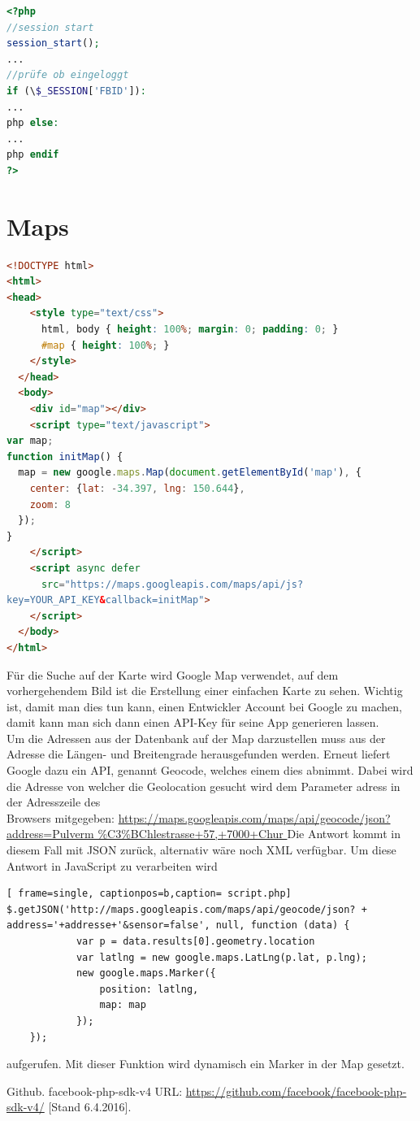 \documentclass[11pt,a4paper]{scrreprt}
\begin{document}
\begin{lstlisting}[language=PHP, frame=single, captionpos=b,caption= search\_list.php]
<?php
//session start
session_start(); 
...
//prüfe ob eingeloggt
if (\$_SESSION['FBID']):
...
php else: 
...
php endif 
?> 
\end{lstlisting}

\section{Maps}
\begin{lstlisting}[language=HTML, frame=single, captionpos=b]
<!DOCTYPE html>
<html>
<head>
    <style type="text/css">
      html, body { height: 100%; margin: 0; padding: 0; }
      #map { height: 100%; }
    </style>
  </head>
  <body>
    <div id="map"></div>
    <script type="text/javascript">
var map;
function initMap() {
  map = new google.maps.Map(document.getElementById('map'), {
    center: {lat: -34.397, lng: 150.644},
    zoom: 8
  });
}
    </script>
    <script async defer
      src="https://maps.googleapis.com/maps/api/js?
key=YOUR_API_KEY&callback=initMap">
    </script>
  </body>
</html>
\end{lstlisting}

\newpage
\noindent
Für die Suche auf der Karte wird Google Map verwendet, auf dem vorhergehendem Bild ist die Erstellung einer einfachen Karte zu sehen. Wichtig ist, damit man dies tun kann, einen Entwickler Account bei Google zu machen, damit kann man sich dann einen API-Key für seine App generieren lassen.\\

\noindent
Um die Adressen aus der Datenbank auf der Map darzustellen muss aus der Adresse die Längen- und Breitengrade herausgefunden werden. Erneut liefert Google dazu ein API, genannt Geocode, welches einem dies abnimmt. Dabei wird die Adresse von welcher die Geolocation gesucht wird dem Parameter adress in der Adresszeile des \\ 
Browsers mitgegeben: \url{ https://maps.googleapis.com/maps/api/geocode/json?address=Pulverm
Die Antwort kommt in diesem Fall mit JSON zurück, alternativ wäre noch XML verfügbar. Um diese Antwort in JavaScript zu verarbeiten wird        

\begin{lstlisting}[ frame=single, captionpos=b,caption= script.php]
$.getJSON('http://maps.googleapis.com/maps/api/geocode/json? + 
address='+addresse+'&sensor=false', null, function (data) {
            var p = data.results[0].geometry.location
            var latlng = new google.maps.LatLng(p.lat, p.lng);
            new google.maps.Marker({
                position: latlng,
                map: map
            });
    });
\end{lstlisting}
aufgerufen. Mit dieser Funktion wird dynamisch ein Marker in der Map gesetzt. 

\newpage
\begin{thebibliography}{999}

  Github. facebook-php-sdk-v4
 URL: \url{https://github.com/facebook/facebook-php-sdk-v4/} [Stand 6.4.2016].
\end{thebibliography}
\end{document}
